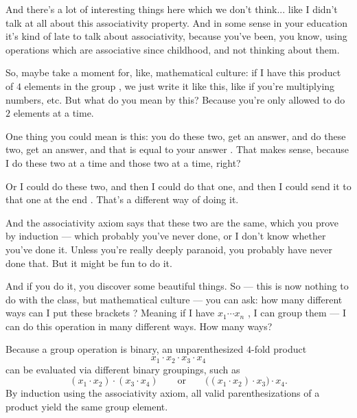 \begin{speech}[00:51:50 - 00:53:41]
And there's a lot of interesting things here which we don't think... like I didn't talk at all about this associativity property. And in some sense in your education it's kind of late to talk about associativity, because you've been, you know, using operations which are associative since childhood, and not thinking about them.

So, maybe take a moment for, like, mathematical culture: if I have this product of $4$ elements in the group , we just write it like this, like if you're multiplying numbers, etc. But what do you mean by this? Because you're only allowed to do $2$ elements at a time.

One thing you could mean is this: you do these two, get an answer, and do these two, get an answer, and that is equal to your answer . That makes sense, because I do these two at a time and those two at a time, right?

Or I could do these two, and then I could do that one, and then I could send it to that one at the end . That's a different way of doing it.

And the associativity axiom says that these two are the same, which you prove by induction --- which probably you've never done, or I don't know whether you've done it. Unless you're really deeply paranoid, you probably have never done that. But it might be fun to do it.

And if you do it, you discover some beautiful things. So --- this is now nothing to do with the class, but mathematical culture --- you can ask: how many different ways can I put these brackets ? Meaning if I have $x_1 \cdots x_n$ , I can group them --- I can do this operation in many different ways. How many ways?
\end{speech}

\begin{content}
Because a group operation is binary, an unparenthesized $4$-fold product
\[
x_1 \cdot x_2 \cdot x_3 \cdot x_4
\]
can be evaluated via different binary groupings, such as
\[
(x_1 \cdot x_2) \cdot (x_3 \cdot x_4) \qquad \text{or} \qquad \bigl((x_1 \cdot x_2) \cdot x_3\bigr) \cdot x_4.
\]
By induction using the associativity axiom, all valid parenthesizations of a product yield the same group element.

\end{content}

